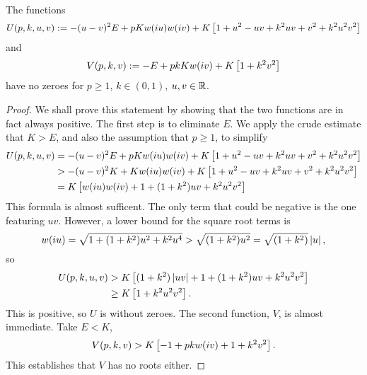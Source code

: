 \begin{lem}
    \label{lem:deriv no zeroes}
The functions
\[
U(p,k,u,v) := -(u-v)^2 E + pKw(i u)w(i v) + K\left[ 1 + u^2 - uv + k^2 uv + v^2 + k^2 u^2 v^2 \right]
\]
and
\[
V(p,k,v) := -E + pkKw(i v) + K\left[ 1 + k^2v^2 \right]
\]
have no zeroes for $p \geq 1$, $k\in (0,1)$, $u,v \in \mathbb{R}$.
\begin{proof}
We shall prove this statement by showing that the two functions are in fact always positive. The first step is to eliminate $E$. We apply the crude estimate that $K>E$, 
and also the assumption that $p\geq 1$, to simplify
\begin{align*}
U(p,k,u,v)
&= -(u-v)^2 E + pKw(i u)w(i v) + K\left[ 1 + u^2 - uv + k^2 uv + v^2 + k^2 u^2 v^2 \right] \\
&> -(u-v)^2 K + Kw(i u)w(i v) + K\left[ 1 + u^2 - uv + k^2 uv + v^2 + k^2 u^2 v^2 \right] \\
&= K \left[ w(i u)w(i v) + 1 + (1 + k^2) uv + k^2 u^2 v^2 \right]
\end{align*}
This formula is almost sufficent. The only term that could be negative is the one featuring $uv$. However, a lower bound for the square root terms is
\[
w(i u) = \sqrt{1 + (1+k^2)u^2 + k^2u^4} > \sqrt{(1+k^2)u^2} = \sqrt{(1+k^2)}\left|u\right|,
\]
so
\begin{align*}
U(p,k,u,v)
&> K \left[ (1+k^2)\left|uv\right| + 1 + (1 + k^2) uv + k^2 u^2 v^2 \right] \\
&\geq K \left[ 1 + k^2 u^2 v^2 \right].
\end{align*}
This is positive, so $U$ is without zeroes. The second function, $V$, is almost immediate. Take $E<K$,
\[
V(p,k,v) > K \left[ -1 + pk w(i v) + 1 + k^2 v^2\right].
\]
This establishes that $V$ has no roots either.
\end{proof}
\end{lem}


